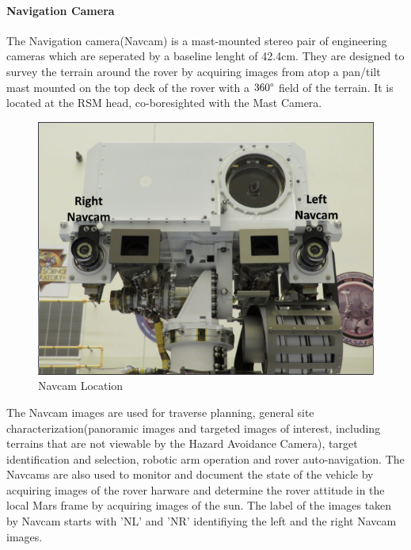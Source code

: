 \paragraph{Navigation Camera}
\label{navigationCamera}

The Navigation camera(Navcam) is a mast-mounted stereo pair of engineering cameras which are seperated by a baseline lenght of 42.4cm. They are designed to survey the terrain around the rover by acquiring images from atop a pan/tilt mast mounted on the top deck of the rover with a $360\degree$ field of the terrain. It is located at the RSM head, co-boresighted with the Mast Camera.
\begin{figure}[H]
	\centering
	\includegraphics[scale=0.5]{img/locationNavcams.png}
	\caption{Navcam Location}
	\label{fig:navcamLocation}
\end{figure}
The Navcam images are used for traverse planning, general site characterization(panoramic images and targeted images of interest, including terrains that are not viewable by the Hazard Avoidance Camera), target identification and selection, robotic arm operation and rover auto-navigation. The Navcams are also used to monitor and document the state of the vehicle by acquiring images of the rover harware and determine the rover attitude in the local Mars frame by acquiring images of the sun. The label of the images taken by Navcam starts with 'NL' and 'NR' identifiying the left and the right Navcam images. 

